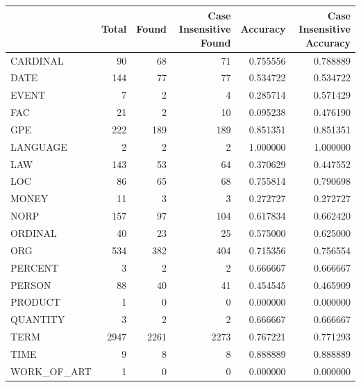 \begin{tabular}{lrrrrr}
\toprule
 & Total & Found & Case Insensitive Found & Accuracy & Case Insensitive Accuracy \\
\midrule
CARDINAL & 90 & 68 & 71 & 0.755556 & 0.788889 \\
DATE & 144 & 77 & 77 & 0.534722 & 0.534722 \\
EVENT & 7 & 2 & 4 & 0.285714 & 0.571429 \\
FAC & 21 & 2 & 10 & 0.095238 & 0.476190 \\
GPE & 222 & 189 & 189 & 0.851351 & 0.851351 \\
LANGUAGE & 2 & 2 & 2 & 1.000000 & 1.000000 \\
LAW & 143 & 53 & 64 & 0.370629 & 0.447552 \\
LOC & 86 & 65 & 68 & 0.755814 & 0.790698 \\
MONEY & 11 & 3 & 3 & 0.272727 & 0.272727 \\
NORP & 157 & 97 & 104 & 0.617834 & 0.662420 \\
ORDINAL & 40 & 23 & 25 & 0.575000 & 0.625000 \\
ORG & 534 & 382 & 404 & 0.715356 & 0.756554 \\
PERCENT & 3 & 2 & 2 & 0.666667 & 0.666667 \\
PERSON & 88 & 40 & 41 & 0.454545 & 0.465909 \\
PRODUCT & 1 & 0 & 0 & 0.000000 & 0.000000 \\
QUANTITY & 3 & 2 & 2 & 0.666667 & 0.666667 \\
TERM & 2947 & 2261 & 2273 & 0.767221 & 0.771293 \\
TIME & 9 & 8 & 8 & 0.888889 & 0.888889 \\
WORK_OF_ART & 1 & 0 & 0 & 0.000000 & 0.000000 \\
\bottomrule
\end{tabular}
